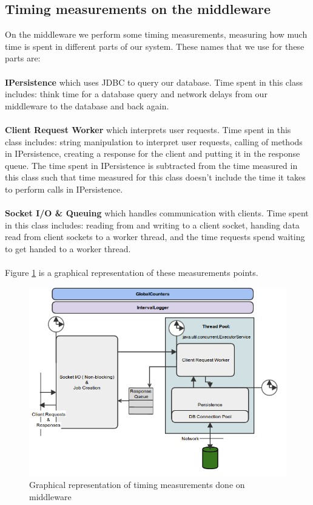 \documentclass{article}
\begin{document}
        \subsection{Timing measurements on the middleware}
            On the middleware we perform some timing measurements, measuring how much time is spent in different parts of our system. These names that we use for these parts are:\\
            \\
            \indent \textbf{IPersistence} which uses JDBC to query our database. Time spent in this class includes: think time for a database query and network delays from our middleware to the database and back again.\\
            \\
            \indent \textbf{Client Request Worker} which interprets user requests. Time spent in this class includes: string manipulation to interpret user requests, calling of methods in IPersistence, creating a response for the client and putting it in the response queue. The time spent in IPersistence is subtracted from the time measured in this class such that time measured for this class doesn't include the time it takes to perform calls in IPersistence.\\
            \\
            \indent \textbf{Socket I/O \& Queuing} which handles communication with clients. Time spent in this class includes: reading from and writing to a client socket, handing data read from client sockets to a worker thread, and the time requests spend waiting to get handed to a worker thread.
            \\
            \\
            Figure \ref{fig:timing_measurements} is a graphical representation of these measurements points.\\
            \begin{figure}[H]
                \centering
                \centerline{\includegraphics[scale=0.50]{timing_measurements}}
                \caption{Graphical representation of timing measurements done on middleware}
                \label{fig:timing_measurements}
            \end{figure}
\end{document}
